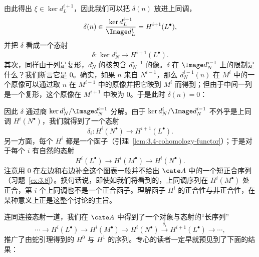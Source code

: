 由此得出 $\xi\in\ker d_L^{i+1}$，因此我们可以把 $\delta(n)$ 放进上同调，
\[
\delta(n)\in \frac{\ker d_L^{i+1}}{\Image d_L^i}=H^{i+1}(L^\bullet),
\]
并把 $\delta$ 看成一个态射
\[
\delta:\ker d_N^i\longrightarrow H^{i+1}(L^\bullet).
\]
其次，同样由于列是复形，$d_N^i$ 的核包含 $d_N^{i-1}$ 的像。$\delta$ 在 $\Image d_N^{i-1}$ 上的限制是什么？我们断言它是 $0$。确实，如果 $n$ 来自 $N^{i-1}$，那么 $d_N^{i-1}(n)$ 在 $M^i$ 中的一个原像可以通过取 $n$ 在 $M^{i-1}$ 中的原像并把它映到 $M^i$ 而得到；但由于中间一列是一个复形，这个原像在 $M^{i+1}$ 中映为 $0$。于是此时 $\delta(n)=0$：
\begin{center}
\end{center}
因此 $\delta$ 通过商 $\ker d_N^i/\Image d_N^{i-1}$ 分解。由于 $\ker d_N^i/\Image d_N^{i-1}$ 不外乎是上同调 $H^i(N^\bullet)$，我们就得到了一个态射
\[
\delta_i:H^i(N^\bullet)\longrightarrow H^{i+1}(L^\bullet).
\]
另一方面，每个 $H^i$ 都是一个函子（引理~\ref{lem:3.4-cohomology-functor}）；于是对于每个 $i$ 有自然的态射
\[
H^i(L^\bullet)\longrightarrow H^i(M^\bullet)\longrightarrow H^i(N^\bullet).
\]
注意用 $0$ 在左边和右边补全这个图表一般并不给出 $\cate A$ 中的一个短正合序列（习题~\ref{ex:3.8}）。换句话说，即使如我们将看到的，上同调序列在 $H^i(M^\bullet)$ 处正合，第 $i$ 个上同调也不是一个正合函子。理解函子 $H^i$ 的正合性与非正合性，在某种意义上正是这整个讨论的主旨。

连同连接态射一道，我们在 $\cate A$ 中得到了一个对象与态射的“长序列”
\[
\cdots\longrightarrow H^i(L^\bullet)\longrightarrow H^i(M^\bullet)\longrightarrow H^i(N^\bullet)\xrightarrow{\delta_i} H^{i+1}(L^\bullet)\longrightarrow\cdots,
\]
推广了由蛇引理得到的 $H^0$ 与 $H^1$ 的序列。专心的读者一定早就预见到了下面的结果：

